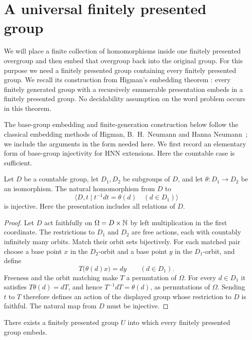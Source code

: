 \section{A universal finitely presented group}
\label{sec:universal}

We will place a finite collection of homomorphisms inside one finitely
presented overgroup and then embed that overgroup back into the original
group.  For this purpose we need a finitely presented group containing
every finitely presented group.  We recall its construction from
Higman's embedding theorem \cite{Higman1961}: every finitely generated
group with a recursively enumerable presentation embeds in a finitely
presented group.  No decidability assumption on the word problem occurs
in this theorem.

The base-group embedding and finite-generation construction below
follow the classical embedding methods of Higman, B.~H.~Neumann and
Hanna Neumann~\cite[Theorems~I, I', and~IV]{HNN1949}; we include the arguments
in the form needed here. We first record an elementary form of
base-group injectivity for HNN extensions. Here the countable case is
sufficient.

\begin{lemma}\label{lem:hnn-injection}
Let $D$ be a countable group, let $D_1,D_2$ be subgroups of $D$, and let
$\theta:D_1\to D_2$ be an isomorphism.  The natural homomorphism from $D$
to
\[
 \bigl\langle D,t\mid t^{-1}dt=\theta(d)\quad(d\in D_1)\bigr\rangle
\]
is injective.  Here the presentation includes all relations of $D$.
\end{lemma}

\begin{proof}
Let $D$ act faithfully on $\Omega=D\times\mathbb N$ by left multiplication
in the first coordinate.  The restrictions to $D_1$ and $D_2$ are free
actions, each with countably infinitely many orbits.  Match their orbit
sets bijectively.  For each matched pair choose a base point $x$ in the
$D_2$-orbit and a base point $y$ in the $D_1$-orbit, and define
\[
 T\bigl(\theta(d)x\bigr)=dy\qquad(d\in D_1).
\]
Freeness and the orbit matching make $T$ a permutation of $\Omega$.
For every $d\in D_1$ it satisfies $T\theta(d)=dT$, and hence
$T^{-1}dT=\theta(d)$, as permutations of $\Omega$.  Sending $t$ to $T$
therefore defines an action of the displayed group whose restriction to
$D$ is faithful.  The natural map from $D$ must be injective.
\end{proof}

\begin{lemma}\label{lem:universal}
There exists a finitely presented group $U$ into which every finitely
presented group embeds.
\end{lemma}

